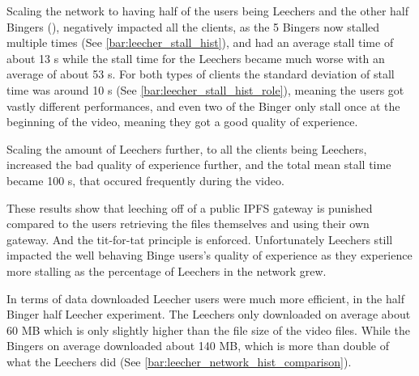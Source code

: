 \if{}



\fi

Scaling the network to having half of the users being Leechers and the other half Bingers (), negatively impacted all the clients, as the 5 Bingers now stalled multiple times (See \autoref{bar:leecher_stall_hist}), and had an average stall time of about 13 \ac{s} while the stall time for the Leechers became much worse with an average of about 53 \ac{s}. For both types of clients the standard deviation of stall time was around 10 \ac{s} (See \autoref{bar:leecher_stall_hist_role}), meaning the users got vastly different performances, and even two of the Binger only stall once at the beginning of the video, meaning they got a good quality of experience.

\if{}


\fi
%

Scaling the amount of Leechers further, to all the clients being Leechers, increased the bad quality of experience further, and the total mean stall time became 100 \ac{s}, that occured frequently during the video.

These results show that leeching off of a public \ac{IPFS} gateway is punished compared to the users retrieving the files themselves and using their own gateway. And the tit-for-tat principle is enforced. Unfortunately Leechers still impacted the well behaving Binge users's quality of experience as they experience more stalling as the percentage of Leechers in the network grew.

In terms of data downloaded Leecher users were much more efficient, in the half Binger half Leecher experiment. The Leechers only downloaded on average about 60 \ac{MB} which is only slightly higher than the file size of the video files. While the Bingers on average downloaded about 140 \ac{MB}, which is more than double of what the Leechers did (See \autoref{bar:leecher_network_hist_comparison}). 

